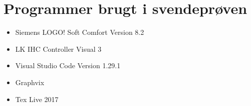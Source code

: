 \section{Programmer brugt i svendeprøven}
\begin{itemize}
    \item Siemens LOGO! Soft Comfort Version 8.2
    \item LK IHC Controller Visual 3
    \item Visual Studio Code Version 1.29.1
    \item Graphvix
    \item Tex Live 2017
\end{itemize}